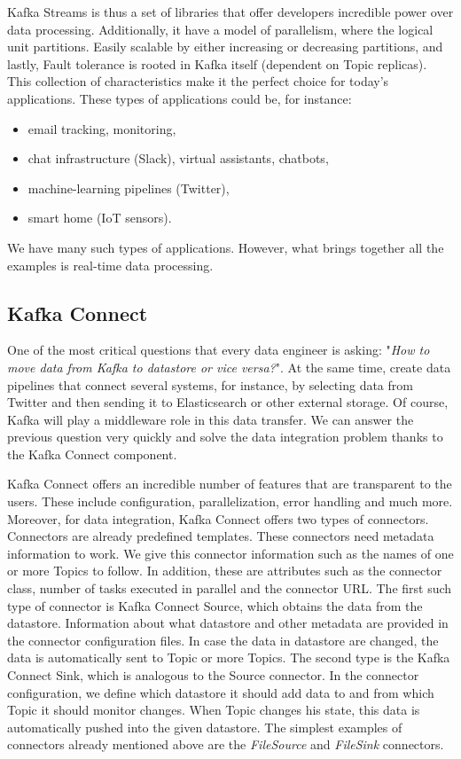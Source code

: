 Kafka Streams is thus a set of libraries that offer developers incredible power over data processing. Additionally, it have a model of parallelism, where the logical unit partitions. Easily scalable by either increasing or decreasing partitions, and lastly, Fault tolerance is rooted in Kafka itself (dependent on Topic replicas). This collection of characteristics make it the perfect choice for today's applications. These types of applications could be, for instance:
\begin{itemize}[itemsep=1mm, parsep=0pt]
    \item email tracking, monitoring,
    \item chat infrastructure (Slack), virtual assistants, chatbots,
    \item machine-learning pipelines (Twitter),
    \item smart home (IoT sensors).
\end{itemize}
We have many such types of applications. However, what brings together all the examples is real-time data processing.	

\subsection*{Kafka Connect}

One of the most critical questions that every data engineer is asking: "\emph{How to move data from Kafka to datastore or vice versa?}". At the same time, create data pipelines that connect several systems, for instance, by selecting data from Twitter and then sending it to Elasticsearch or other external storage. Of course, Kafka will play a middleware role in this data transfer. We can answer the previous question very quickly and solve the data integration problem thanks to the Kafka Connect component.

Kafka Connect offers an incredible number of features that are transparent to the users. These include configuration, parallelization, error handling and much more. Moreover, for data integration, Kafka Connect offers two types of connectors. Connectors are already predefined templates. These connectors need metadata information to work. We give this connector information such as the names of one or more Topics to follow. In addition, these are attributes such as the connector class, number of tasks executed in parallel and the connector URL. The first such type of connector is Kafka Connect Source, which obtains the data from the datastore. Information about what datastore and other metadata are provided in the connector configuration files. In case the data in datastore are changed, the data is automatically sent to Topic or more Topics. The second type is the Kafka Connect Sink, which is analogous to the Source connector. In the connector configuration, we define which datastore it should add data to and from which Topic it should monitor changes. When Topic changes his state, this data is automatically pushed into the given datastore. The simplest examples of connectors already mentioned above are the \emph{FileSource} and \emph{FileSink} connectors.

